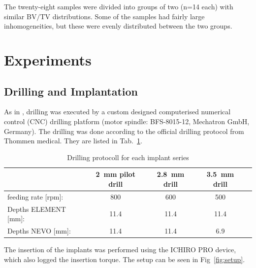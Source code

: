 \documentclass[12pt, a4paper, twoside]{report}
\begin{document}
The twenty-eight samples were divided into groups of two (n=14 each) with similar BV$/$TV distributions.
Some of the samples had fairly large inhomogeneities, but these were evenly distributed between the two groups.
%
\section{Experiments}
%
%
\subsection{Drilling and Implantation}
%
%
As in \citet{wili_experimental_2021}, drilling was executed by a custom designed computerised numerical control (CNC) drilling platform (motor spindle: BFS-8015-12, Mechatron GmbH, Germany).
The drilling was done according to the official drilling protocol from Thommen medical.
They are listed in Tab.~\ref{tab:parameters}.
\begin{table}[H]
\centering
\begin{tabular}{|l|c|c|c|c|}
	\hline 
	& 2 mm pilot drill & 2.8 mm drill & 3.5 mm drill \\
	\hline
	feeding rate [rpm]: & 800 & 600 & 500 \\
	\hline
	Depths ELEMENT [mm]: & 11.4 & 11.4 & 11.4 \\
	\hline
	Depths NEVO [mm]: & 11.4 & 11.4 & 6.9 \\
	\hline
\end{tabular}
\caption{Drilling protocoll for each implant series}
\label{tab:parameters}
\end{table} 
%
%
The insertion of the implants was performed using the ICHIRO PRO device, which also logged the insertion torque.
The setup can be seen in Fig~\ref{fig:setup}.

\end{document}
